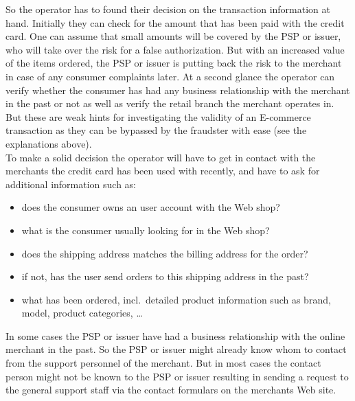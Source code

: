 So the operator has to found their decision on the transaction information at hand. Initially they can check for the amount that has been paid with the credit card. One can assume that small amounts will be covered by the \gls{PSP} or issuer, who will take over the risk for a false authorization. But with an increased value of the items ordered, the \gls{PSP} or issuer is putting back the risk to the merchant in case of any consumer complaints later. At a second glance the operator can verify whether the consumer has had any business relationship with the merchant in the past or not as well as verify the retail branch the merchant operates in. But these are weak hints for investigating the validity of an \gls{E-commerce} transaction as they can be bypassed by the fraudster with ease (see the explanations above). \\

To make a solid decision the operator will have to get in contact with the merchants the credit card has been used with recently, and have to ask for additional information such as:\@

\begin{itemize}
  \item does the consumer owns an user account with the Web shop?
  \item what is the consumer usually looking for in the Web shop?
  \item does the shipping address matches the billing address for the order?
  \item if not, has the user send orders to this shipping address in the past?
  \item what has been ordered, incl.\ detailed product information such as brand, model, product categories, \ldots
\end{itemize}

In some cases the \gls{PSP} or issuer have had a business relationship with the online merchant in the past. So the \gls{PSP} or issuer might already know whom to contact from the support personnel of the merchant. But in most cases the contact person might not be known to the \gls{PSP} or issuer resulting in sending a request to the general support staff via the contact formulars on the merchants Web site. \\

